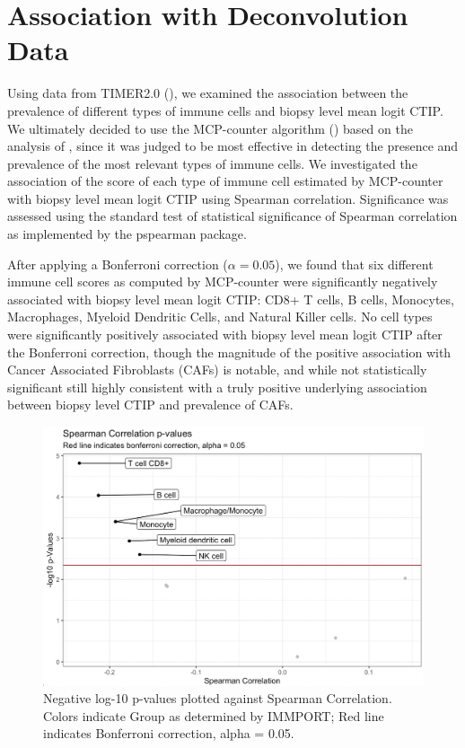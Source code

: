 \documentclass[
]{book}
\begin{document}
\hypertarget{association-with-deconvolution-data}{%
\chapter{Association with Deconvolution Data}\label{association-with-deconvolution-data}}

Using data from TIMER2.0 (\citet{TIMER20}), we examined the association between the prevalence of different types of immune cells and biopsy level mean logit CTIP. We ultimately decided to use the MCP-counter algorithm (\citet{Becht16}) based on the analysis of \citet{Sturm19}, since it was judged to be most effective in detecting the presence and prevalence of the most relevant types of immune cells. We investigated the association of the score of each type of immune cell estimated by MCP-counter with biopsy level mean logit CTIP using Spearman correlation. Significance was assessed using the standard test of statistical significance of Spearman correlation as implemented by the pspearman package.

After applying a Bonferroni correction (\(\alpha = 0.05\)), we found that six different immune cell scores as computed by MCP-counter were significantly negatively associated with biopsy level mean logit CTIP: CD8+ T cells, B cells, Monocytes, Macrophages, Myeloid Dendritic Cells, and Natural Killer cells. No cell types were significantly positively associated with biopsy level mean logit CTIP after the Bonferroni correction, though the magnitude of the positive association with Cancer Associated Fibroblasts (CAFs) is notable, and while not statistically significant still highly consistent with a truly positive underlying association between biopsy level CTIP and prevalence of CAFs.

\begin{figure}

{\centering \includegraphics[width=1\linewidth]{Figures/MCP Spearman Volcano} 

}

\caption{Negative log-10 p-values plotted against Spearman Correlation. Colors indicate Group as determined by IMMPORT; Red line indicates Bonferroni correction, alpha = 0.05.}\label{fig:MCPSpearmanVolc}
\end{figure}
\end{document}
